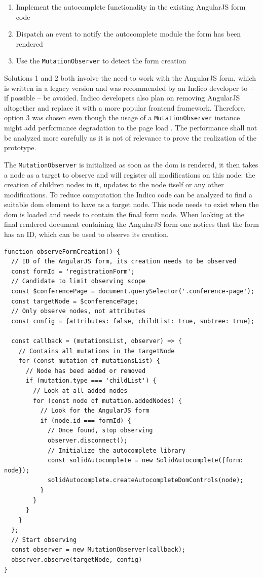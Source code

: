 \begin{enumerate}
    \item Implement the autocomplete functionality in the existing AngularJS form code
    \item Dispatch an event to notify the autocomplete module the form has been rendered
    \item Use the \texttt{MutationObserver} to detect the form creation
\end{enumerate}

Solutions 1 and 2 both involve the need to work with the AngularJS form, which is written in a legacy version and was recommended by an Indico developer to -- if possible -- be avoided. Indico developers also plan on removing AngularJS altogether and replace it with a more popular frontend framework. Therefore, option 3 was chosen even though the usage of a \texttt{MutationObserver} instance might add performance degradation to the page load \cite{dom-spec}. The performance shall not be analyzed more carefully as it is not of relevance to prove the realization of the prototype.

The \texttt{MutationObserver} is initialized as soon as the \gls{dom} is rendered, it then takes a node as a target to observe and will register all modifications on this node: the creation of children nodes in it, updates to the node itself or any other modifications. To reduce computation the Indico code can be analyzed to find a suitable \gls{dom} element to have as a target node. This node needs to exist when the \gls{dom} is loaded and needs to contain the final form node. When looking at the final rendered document containing the AngularJS form one notices that the form has an ID, which can be used to observe its creation.
 
\begin{lstlisting}[language=Other,columns=fullflexible, caption={Observe function in Indico}, label={lst:indico-observe}]
function observeFormCreation() {
  // ID of the AngularJS form, its creation needs to be observed
  const formId = 'registrationForm';
  // Candidate to limit observing scope
  const $conferencePage = document.querySelector('.conference-page');
  const targetNode = $conferencePage;
  // Only observe nodes, not attributes
  const config = {attributes: false, childList: true, subtree: true};

  const callback = (mutationsList, observer) => {
    // Contains all mutations in the targetNode
    for (const mutation of mutationsList) {
      // Node has beed added or removed
      if (mutation.type === 'childList') {
        // Look at all added nodes
        for (const node of mutation.addedNodes) {
          // Look for the AngularJS form
          if (node.id === formId) {
            // Once found, stop observing
            observer.disconnect();
            // Initialize the autocomplete library
            const solidAutocomplete = new SolidAutocomplete({form: node});
            solidAutocomplete.createAutocompleteDomControls(node);
          }
        }
      }
    }
  };
  // Start observing
  const observer = new MutationObserver(callback);
  observer.observe(targetNode, config)
}
\end{lstlisting}

